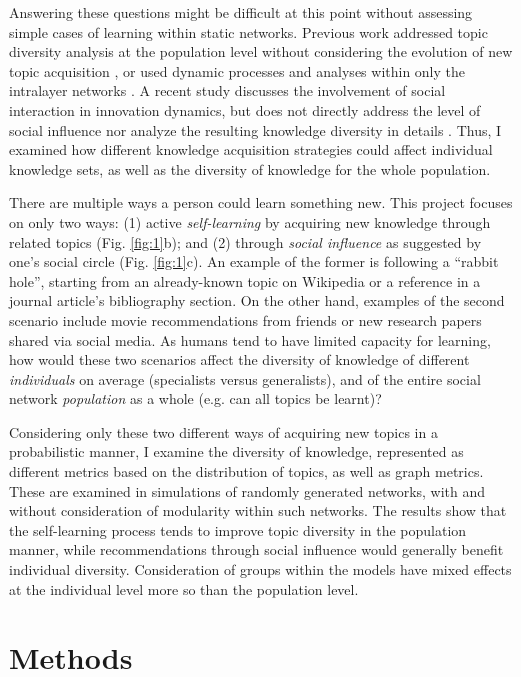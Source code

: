 \documentclass{svproc}
\begin{document}
Answering these questions might be difficult at this point without assessing simple cases of learning within static networks.
Previous work
    addressed topic diversity analysis at the population level without considering the evolution of new topic acquisition \cite{Weng2015-zt},
    or used dynamic processes and analyses within only the intralayer networks \cite{Sun2020-qj}.
A recent study discusses
    the involvement of social interaction in innovation dynamics,
    but does not directly address the level of social influence
    nor analyze the resulting knowledge diversity in details \cite{Iacopini2020-jm}.
Thus, I examined how different knowledge acquisition strategies could affect individual knowledge sets, as well as the diversity of knowledge for the whole population.

There are multiple ways a person could learn something new.
This project focuses on only two ways:
    (1) active \textit{self-learning} by acquiring new knowledge through related topics  (Fig. \ref{fig:1}b);
    and (2) through \textit{social influence} as suggested by one's social circle  (Fig. \ref{fig:1}c).
An example of the former is following a ``rabbit hole'',
    starting from an already-known topic on Wikipedia
    or a reference in a journal article's bibliography section.
On the other hand, examples of the second scenario include
    movie recommendations from friends
    or new research papers shared via social media.
As humans tend to have limited capacity for learning,
    how would these two scenarios affect the diversity of knowledge of
    different \textit{individuals} on average (specialists versus generalists),
    and of the entire social network \textit{population} as a whole (e.g. can all topics be learnt)?

Considering only these two different ways of acquiring new topics in a probabilistic manner,
    I examine the diversity of knowledge,
    represented as different metrics based on the distribution of topics, as well as graph metrics.
These are examined in simulations of randomly generated networks, with and without consideration of modularity within such networks.
The results show that
    the self-learning process tends to improve topic diversity in the population manner,
    while recommendations through social influence would generally benefit individual diversity.
Consideration of groups within the models have mixed effects at the individual level more so than the population level.

\section{Methods} \label{sec:method}
\end{document}
